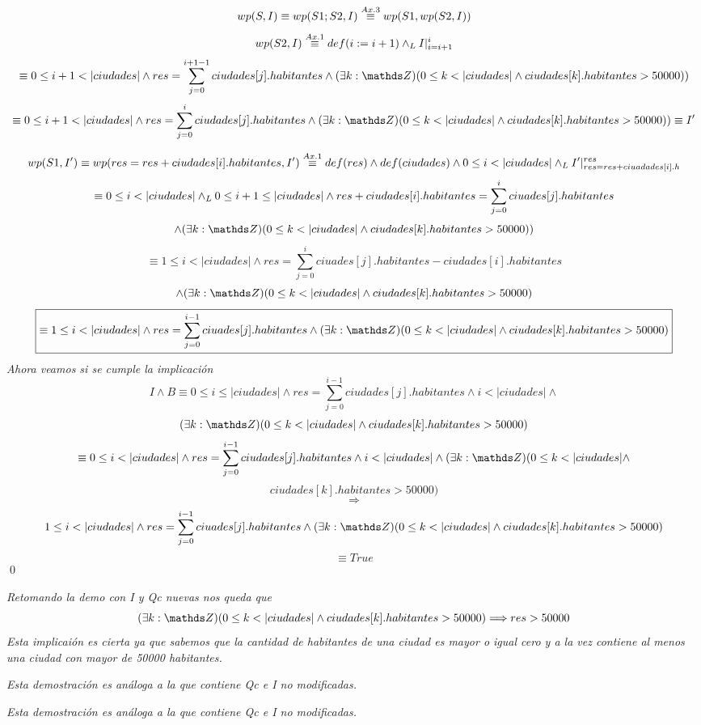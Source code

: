 \documentclass[10pt,a4paper]{article}
\begin{document}
\begin{demo2}

		
		\[
		wp(S,I) \equiv wp(S1;S2,I) \overset{\scriptsize Ax. 3}{\equiv}wp(S1,wp(S2,I))
		\]
		\[ 	wp(S2,I) \overset{\scriptsize Ax. 1}{\equiv} def(i:=i+1) \land _L I|_{i=i+1}^{i}
		\]	
		\[ \equiv 0\leq i+1 <|ciudades| \land res=\sum_{j=0}^{i+1-1} ciudades[j].habitantes\land (\exists k: \ent)(0 \leq k < |ciudades| \land 
		ciudades[k].habitantes > 50000))\]
			\[ \equiv 0\leq i+1 <|ciudades| \land res=\sum_{j=0}^{i} ciudades[j].habitantes \land (\exists k: \ent)(0 \leq k < |ciudades| \land 
			ciudades[k].habitantes > 50000))   \equiv I' \]\par
		
		\[wp(S1,I') \equiv wp(res=res+ciudades[i].habitantes,I')\overset{\scriptsize Ax. 1}{\equiv} def(res) \land def(ciudades) \land 0 \leq i < |ciudades| \land _L I'|_{res=res+ciuadades[i].h}^{res}\]
		\[
		\equiv 0 \leq i <|ciudades| \yLuego 0\leq i+1 \leq |ciudades|\land res+ ciudades[i].habitantes=\sum_{j=0}^{i} ciuades[j].habitantes 
		\]
		\[\land(\exists k: \ent)(0 \leq k < |ciudades| \land ciudades[k].habitantes > 50000))\]
		\[\equiv 1 \leq i < |ciudades| \land res=\sum_{j=0}^{i} ciuades[j].habitantes -ciudades[i].habitantes \]
		\[\land (\exists k: \ent)(0 \leq k < |ciudades| \land ciudades[k].habitantes > 50000) \]
		\[
		\boxed{	\equiv 1 \leq i < |ciudades| \land res=\sum_{j=0}^{i-1} ciuades[j].habitantes \land (\exists k: \ent)(0 \leq k < |ciudades| \land ciudades[k].habitantes > 50000)}
		\]
		\textit{Ahora veamos si se cumple la implicación}
		\[
		I \land B \equiv 0 \leq i \leq |ciudades| \land res= \sum_{j=0}^{i-1} ciudades[j].habitantes \land  i < \lvert ciudades \rvert \land
		\]
		\[(\exists k: \ent)(0 \leq k < |ciudades| \land ciudades[k].habitantes > 50000) 
		\]
		\[\equiv  0 \leq i < |ciudades| \land res= \sum_{j=0}^{i-1} ciudades[j].habitantes \land  i < \lvert ciudades \rvert \land (\exists k: \ent)(0 \leq k < |ciudades| \land\]
		\[ ciudades[k].habitantes > 50000) \]
		\[\Longrightarrow\]
		\[ 1 \leq i < |ciudades| \land res=\sum_{j=0}^{i-1} ciuades[j].habitantes \land (\exists k: \ent)(0 \leq k < |ciudades| \land ciudades[k].habitantes > 50000) \] 
		\[\equiv True\]
		\qed 

\end{demo2}

\begin{demo3}
	\noindent
		\textit{Retomando la demo con I y Qc nuevas nos queda que}
	\[(\exists k: \ent)(0 \leq k < |ciudades| \land ciudades[k].habitantes > 50000) \Longrightarrow res>50000\]
	\textit{Esta implicai\'on es cierta ya que sabemos que la cantidad de habitantes de una ciudad es mayor o igual cero y a la vez contiene al menos una ciudad con mayor de 50000 habitantes. }
\end{demo3}

\begin{demo4}
 \textit{Esta demostración es análoga a la que contiene Qc e I no modificadas.}
\end{demo4}

\begin{demo5}
	
	\noindent \textit{Esta demostración es análoga a la que contiene Qc e I no modificadas.}
\end{demo5}
\end{document}
